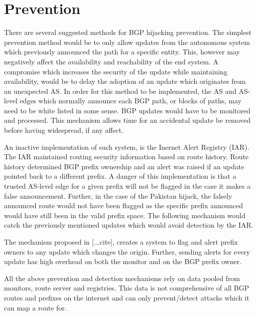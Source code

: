  \section{Prevention}\label{sec:prevention}
 
 There are several suggested methods for BGP hijacking prevention. The simplest prevention method would be to only allow updates from the autonomous system which previously announced the path for a specific entity. This, however may negatively affect the availability and reachability of the end system. A compromise which increases the security of the update while maintaining availability, would be to delay the adoption of an update which originates from an unexpected AS. In order for this method to be implemented, the AS and AS-level edges which normally announce each BGP path, or blocks of paths, may need to be white listed in some sense. BGP updates would have to be monitored and processed. This mechanism allows time for an accidental update be removed before having widespread, if any affect. 
 
An inactive implementation of such system, is the Inernet Alert Registry (IAR). The IAR  maintained routing security information based on route history. Route history determined BGP prefix ownership and an alert was raised if an update pointed back to a different prefix. A danger of this implementation is that a trusted AS-level edge for a given prefix will not be flagged in the case it makes a false announcement. Further, in the case of the Pakistan hijack, the falsely announced route would not have been flagged as the specific prefix announced would have still been in the valid prefix space. The following mechanism would catch the previously mentioned updates which would avoid detection by the IAR.

The mechanism proposed in [...cite], creates a system to flag and alert prefix owners to any update which changes the origin. Further, sending alerts for every update has high overhead on both the monitor and on the BGP prefix owner.  

All the above prevention and detection mechanisms rely on data pooled from monitors, route server and registries. This data is not comprehensive of all BGP routes and prefixes on the internet and can only prevent/detect attacks which it can map a route for.
 
 